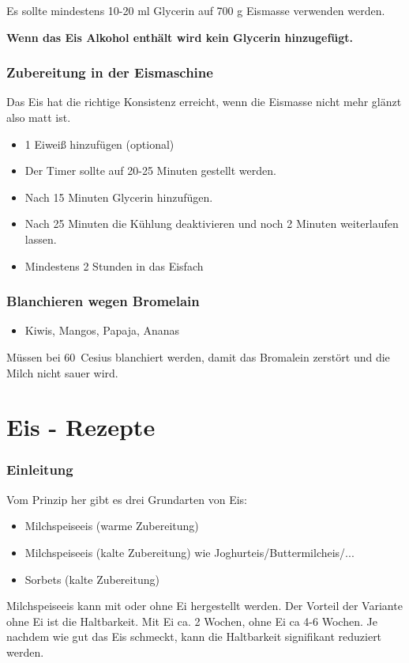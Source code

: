 \documentclass[12pt]{article}
\newcommand\degree[1]{\mbox{#1 \textdegree{} Cesius}}
\begin{document}
Es sollte mindestens 10-20 ml Glycerin auf 700 g Eismasse verwenden werden. 

\textbf{Wenn das Eis Alkohol enthält wird kein Glycerin hinzugefügt. }


\section{Zubereitung in der Eismaschine}
Das Eis hat die richtige Konsistenz erreicht, wenn die Eismasse nicht mehr glänzt also matt ist. 
\begin{itemize}
  \item 1 Eiweiß hinzufügen (optional)
  \item Der Timer sollte auf 20-25 Minuten gestellt werden.
  \item Nach 15 Minuten Glycerin hinzufügen.
  \item Nach 25 Minuten die Kühlung deaktivieren und noch 2 Minuten weiterlaufen lassen.
  \item Mindestens 2 Stunden in das Eisfach
\end{itemize}


\section{Blanchieren wegen Bromelain}
\begin{itemize}
  \item Kiwis, Mangos, Papaja, Ananas
\end{itemize}
Müssen bei \degree{60} blanchiert werden, damit das Bromalein zerstört und die Milch nicht sauer wird.

\newpage
\part{Eis - Rezepte}

\section {Einleitung}
Vom Prinzip her gibt es drei Grundarten von Eis:
\begin{itemize}
  \item Milchspeiseeis (warme Zubereitung)
  \item Milchspeiseeis (kalte Zubereitung) wie Joghurteis/Buttermilcheis/...
  \item Sorbets (kalte Zubereitung)
\end{itemize}

Milchspeiseeis kann mit oder ohne Ei hergestellt werden. Der Vorteil der  Variante ohne Ei ist die Haltbarkeit. Mit Ei ca. 2 Wochen, ohne Ei ca 4-6 Wochen. Je nachdem wie gut das Eis schmeckt, kann die Haltbarkeit signifikant reduziert werden.
\end{document}
